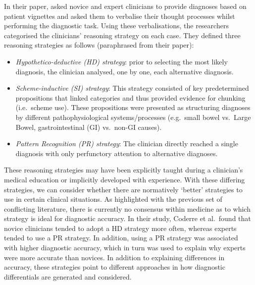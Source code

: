 \documentclass[a4paper, nobind]{templates/ociamthesis}
\begin{document}
\hfill\break
In their paper, \textcite{coderre_diagnostic_2003} asked novice and expert clinicians to provide diagnoses based on patient vignettes and asked them to verbalise their thought processes whilst performing the diagnostic task. Using these verbalisations, the researchers categorised the clinicians' reasoning strategy on each case. They defined three reasoning strategies as follows (paraphrased from their paper):

\begin{itemize}
\item
  \emph{Hypothetico-deductive (HD) strategy}: prior to selecting the most likely diagnosis, the clinician analysed, one by one, each alternative diagnosis.
\item
  \emph{Scheme-inductive (SI) strategy}: This strategy consisted of key predetermined propositions that linked categories and thus provided evidence for chunking (i.e.~scheme use). These propositions were presented as structuring diagnoses by different pathophysiological systems/processes (e.g.~small bowel vs.~Large Bowel, gastrointestinal (GI) vs.~non-GI causes).
\item
  \emph{Pattern Recognition (PR) strategy}: The clinician directly reached a single diagnosis with only perfunctory attention to alternative diagnoses.
\end{itemize}

These reasoning strategies may have been explicitly taught during a clinician's medical education or implicitly developed with experience. With these differing strategies, we can consider whether there are normatively `better' strategies to use in certain clinical situations. As highlighted with the previous set of conflicting literature, there is currently no consensus within medicine as to which strategy is ideal for diagnostic accuracy. In their study, Coderre et al.~found that novice clinicians tended to adopt a HD strategy more often, whereas experts tended to use a PR strategy. In addition, using a PR strategy was associated with higher diagnostic accuracy, which in turn was used to explain why experts were more accurate than novices. In addition to explaining differences in accuracy, these strategies point to different approaches in how diagnostic differentials are generated and considered.
\end{document}
